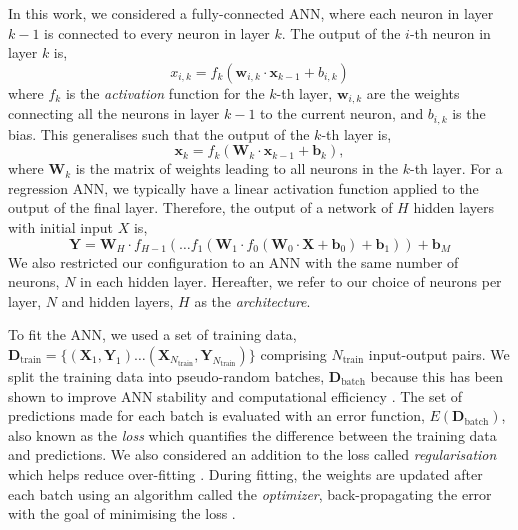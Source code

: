 \documentclass[a4paper,fleqn,usenatbib]{mnras}
\begin{document}
In this work, we considered a fully-connected ANN, where each neuron in layer $k-1$ is connected to every neuron in layer $k$. The output of the $i$-th neuron in layer $k$ is, 
%
\begin{equation}
    x_{i, k}=f_k(\boldsymbol{w}_{i, k} \cdot \boldsymbol{x}_{k-1} + b_{i, k})
\end{equation}
%
where $f_k$ is the \emph{activation} function for the $k$-th layer, $\boldsymbol{w}_{i, k}$ are the weights connecting all the neurons in layer $k-1$ to the current neuron, and $b_{i, k}$ is the bias. This generalises such that the output of the $k$-th layer is,
%
\begin{equation}
    \boldsymbol{x}_{k}=f_k(\boldsymbol{W}_{k} \cdot \boldsymbol{x}_{k-1} + \boldsymbol{b}_{k}),
\end{equation}
%
where $\boldsymbol{W}_k$ is the matrix of weights leading to all neurons in the $k$-th layer. For a regression ANN, we typically have a linear activation function applied to the output of the final layer. Therefore, the output of a network of $H$ hidden layers with initial input $X$ is,
%
\begin{equation}
    \boldsymbol{Y} = \boldsymbol{W}_{H} \cdot f_{H-1}(\dots f_1(\boldsymbol{W}_1 \cdot f_0(\boldsymbol{W}_{0} \cdot \boldsymbol{X} + \boldsymbol{b}_{0}) + \boldsymbol{b}_1) ) + \boldsymbol{b}_{M}
\end{equation}
%
We also restricted our configuration to an ANN with the same number of neurons, $N$ in each hidden layer. Hereafter, we refer to our choice of neurons per layer, $N$ and hidden layers, $H$ as the \emph{architecture}. 

To fit the ANN, we used a set of training data, $\boldsymbol{D}_\mathrm{train} = \{(\boldsymbol{X}_1, \boldsymbol{Y}_1) \dots (\boldsymbol{X}_{N_\mathrm{train}}, \boldsymbol{Y}_{N_\mathrm{train}})\}$ comprising $N_\mathrm{train}$ input-output pairs. We split the training data into pseudo-random batches, $\boldsymbol{D}_\mathrm{batch}$ because this has been shown to improve ANN stability and computational efficiency \citep{Masters.Luschi2018}. The set of predictions made for each batch is evaluated with an error function, $E(\boldsymbol{D}_\mathrm{batch})$, also known as the \emph{loss} which quantifies the difference between the training data and predictions. We also considered an addition to the loss called \emph{regularisation} which helps reduce over-fitting \citep{Goodfellow.Bengio.ea2016}. During fitting, the weights are updated after each batch using an algorithm called the \emph{optimizer}, back-propagating the error with the goal of minimising the loss \citep[see e.g.][]{Rumelhart.Hinton.ea1986}.
\end{document}
